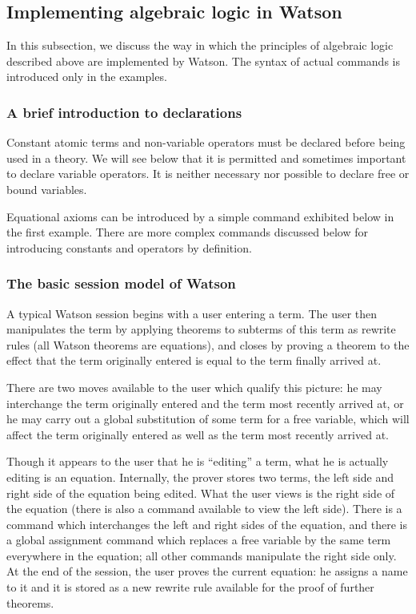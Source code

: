\documentclass{kluwer}
\begin{document}
\begin{article}
\subsection{Implementing algebraic logic in Watson}

In this subsection, we discuss the way in which the principles of algebraic
logic described above are implemented by Watson.  The syntax of actual commands
is introduced only in the examples.

\subsubsection{A brief introduction to declarations}

Constant atomic terms and non-variable operators must be declared
before being used in a theory.  We will see below that it is permitted
and sometimes important to declare variable operators.  It is neither
necessary nor possible to declare free or bound variables.

Equational axioms can be introduced by a simple command exhibited
below in the first example.  There are more complex commands discussed
below for introducing constants and operators by definition.

\subsubsection{The basic session model of Watson}

A typical Watson session begins with a user entering a term.  The user
then manipulates the term by applying theorems to subterms of this
term as rewrite rules (all Watson theorems are equations), and closes
by proving a theorem to the effect that the term originally entered is
equal to the term finally arrived at.

There are two moves available to the user which qualify this picture:
he may interchange the term originally entered and the term most
recently arrived at, or he may carry out a global substitution of some
term for a free variable, which will affect the term originally
entered as well as the term most recently arrived at.

Though it appears to the user that he is ``editing'' a term, what he
is actually editing is an equation.  Internally, the prover stores two
terms, the left side and right side of the equation being edited.
What the user views is the right side of the equation (there is also a
command available to view the left side).  There is a command which
interchanges the left and right sides of the equation, and there is a
global assignment command which replaces a free variable by the same
term everywhere in the equation; all other commands manipulate the
right side only.  At the end of the session, the user proves the
current equation: he assigns a name to it and it is stored as a new
rewrite rule available for the proof of further theorems.


\end{article}
\end{document}
